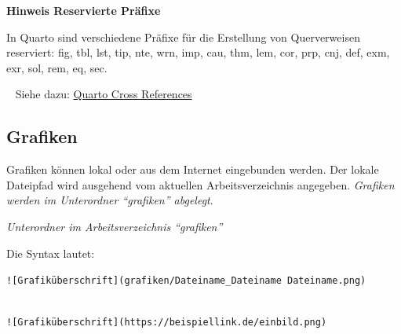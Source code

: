 \documentclass[
  letterpaper,
  DIV=11]{scrartcl}
\providecommand{\tightlist}{%
  \setlength{\itemsep}{0pt}\setlength{\parskip}{0pt}}\usepackage{longtable,booktabs,array}
\begin{document}
\begin{tcolorbox}[enhanced jigsaw, breakable, rightrule=.15mm, leftrule=.75mm, opacityback=0, colframe=quarto-callout-warning-color-frame, toprule=.15mm, left=2mm, colback=white, arc=.35mm, bottomrule=.15mm]
\begin{minipage}[t]{5.5mm}
\textcolor{quarto-callout-warning-color}{\faExclamationTriangle}
\end{minipage}%
\begin{minipage}[t]{\textwidth - 5.5mm}

\vspace{-3mm}\textbf{Hinweis Reservierte Präfixe}\vspace{3mm}

In Quarto sind verschiedene Präfixe für die Erstellung von Querverweisen
reserviert: fig, tbl, lst, tip, nte, wrn, imp, cau, thm, lem, cor, prp,
cnj, def, exm, exr, sol, rem, eq, sec.

\end{minipage}%
\end{tcolorbox}

~ Siehe dazu:
\href{https://quarto.org/docs/authoring/cross-references.html}{Quarto
Cross References}

\subsection{Grafiken}\label{grafiken}

Grafiken können lokal oder aus dem Internet eingebunden werden. Der
lokale Dateipfad wird ausgehend vom aktuellen Arbeitsverzeichnis
angegeben. \emph{Grafiken werden im Unterordner ``grafiken'' abgelegt}.

\begin{description}
\tightlist
\item[Speicherort Grafiken]
\emph{Unterordner im Arbeitsverzeichnis ``grafiken''}
\end{description}

Die Syntax lautet:

\texttt{!{[}Grafiküberschrift{]}(grafiken/Dateiname\_Dateiname\ Dateiname.png)}\strut \\
\texttt{!{[}Grafiküberschrift{]}(https://beispiellink.de/einbild.png)}
\end{document}
